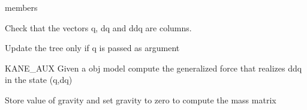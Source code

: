 \documentclass[letterpaper,10pt,english]{sphinxmanual}
\begin{document}
\begin{fulllineitems}
\begin{sphinxuseclass}{members}
\begin{description}
\begin{fulllineitems}
\end{fulllineitems}


\begin{fulllineitems}
\label{\detokenize{bodytree:BodyTree.InverseDynamics}}
\pysigstartsignatures
{}
\pysigstopsignatures
\sphinxAtStartPar
Check that the vectors q, dq and ddq are columns.

\end{fulllineitems}


\begin{fulllineitems}
\label{\detokenize{bodytree:BodyTree.K}}
\pysigstartsignatures
{}
\pysigstopsignatures
\sphinxAtStartPar
Update the tree only if q is passed as argument

\end{fulllineitems}


\begin{fulllineitems}
\label{\detokenize{bodytree:BodyTree.Kane_aux}}
\pysigstartsignatures
{}
\pysigstopsignatures
\sphinxAtStartPar
KANE\_AUX Given a obj model compute the generalized force that realizes ddq in
the state (q,dq)

\end{fulllineitems}


\begin{fulllineitems}
\label{\detokenize{bodytree:BodyTree.MassMatrix}}
\pysigstartsignatures
{}
\pysigstopsignatures
\sphinxAtStartPar
Store value of gravity and set gravity to zero to compute the
mass matrix

\end{fulllineitems}


\end{description}
\end{sphinxuseclass}
\end{fulllineitems}
\end{document}
